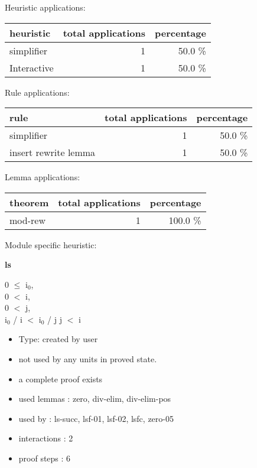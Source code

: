 \documentclass[a4paper]{article}
\begin{document}
\medskip


Heuristic applications:

\begin{supertabular}{l|r|r}
heuristic	& total applications & percentage \\ \hline
simplifier & 1 & 50.0 \% \\
Interactive & 1 & 50.0 \% \\

\end{supertabular}

Rule applications:

\begin{supertabular}{l|r|r}
rule	        & total applications & percentage \\ \hline
simplifier & 1 & 50.0 \% \\
insert rewrite lemma & 1 & 50.0 \% \\

\end{supertabular}

Lemma applications:

\begin{supertabular}{l|r|r}
theorem	        & total applications & percentage \\ \hline
mod-rew & 1 & 100.0 \% \\

\end{supertabular}

Module specific heuristic:

\pagebreak

{\LARGE\bf ls}\label{lemma-ls}

\medskip

0 $\le$ $\mbox{i}_{0}$, \\
0 $<$ i, \\
0 $<$ j, \\
$\mbox{i}_{0}$ / i $<$ $\mbox{i}_{0}$ / j \Fol j $<$ i

\begin{itemize}

\item Type: created by user

\item not used by any units in proved state.
\item       a complete proof exists
\item       used lemmas  : zero, div-elim, div-elim-pos
\item       used by      : ls-succ, lsf-01, lsf-02, lsfc, zero-05
\item       interactions : 2
\item       proof steps  : 6
\end{itemize}
\end{document}
